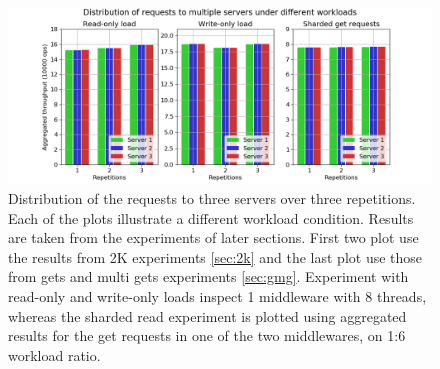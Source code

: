 \documentclass[11pt,a4paper]{article}
\begin{document}
%

\begin{figure}[h]
  \centering
  \includegraphics[width=1.0\linewidth,trim={0px 0px 0px 0px},clip]{img/plot/equal-load-all.png}
\caption{Distribution of the requests to three servers over three repetitions. Each of the plots illustrate a different workload condition. Results are taken from the experiments of later sections. First two plot use the results from 2K experiments \ref{sec:2k} and the last plot use those from gets and multi gets experiments \ref{sec:gmg}. Experiment with read-only and write-only loads inspect 1 middleware with 8 threads, whereas the sharded read experiment is plotted using aggregated results for the get requests in one of the two middlewares, on 1:6 workload ratio.}
\label{fig:equal-load}
\end{figure}
\end{document}
